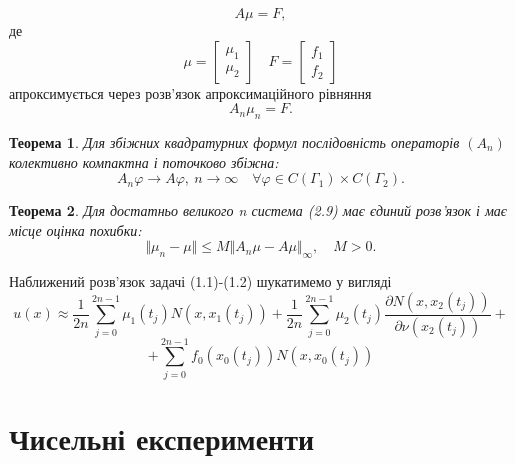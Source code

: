 \documentclass[a4 paper,12pt,ukrainian]{report}
\newtheorem{theorem}{\textbf{Теорема}}[chapter]
\begin{document}
\begin{equation*}
A\mu=F,
\end{equation*}
де 
\begin{equation*}
\mu=\left[
\begin{array}{c}
\mu_{1}\\
\mu_{2}
\end{array}
\right]\quad
F=\left[
\begin{array}{c}
f_{1}\\
f_{2}
\end{array}
\right]
\end{equation*}
апроксимується через розв'язок апроксимаційного рівняння
\begin{equation*}
A_{n}\mu_{n}=F.
\end{equation*}
\begin{theorem}
Для збіжних квадратурних формул послідовність операторів $(A_{n})$ колективно компактна і поточково збіжна:
\begin{equation*}
A_{n}\varphi\rightarrow A\varphi, \ n\to\infty \quad \forall\varphi\in C(\Gamma_{1})\times C(\Gamma_{2}).
\end{equation*}
\end{theorem}
\begin{theorem}
Для достатньо великого n система (2.9) має єдиний розв'язок і має місце оцінка похибки:
\begin{equation*}
\Vert\mu_{n}-\mu\Vert\le M\Vert A_{n}\mu-A\mu\Vert_{\infty}, \quad M>0.
\end{equation*}
\end{theorem}
\hspace*{\parindent}Наближений розв'язок задачі (1.1)-(1.2) шукатимемо у вигляді
\begin{equation*}
u(x)\approx\frac{1}{2n}\sum\limits_{j=0}^{2n-1}{\mu_1(t_j)N(x,x_1(t_j))}+\frac{1}{2n}\sum\limits_{j=0}^{2n-1}{\mu_2(t_j)\frac{\partial N(x,x_2(t_j))}{\partial\nu(x_2(t_j))}}+
\end{equation*}
\begin{equation*}
+\sum\limits_{j=0}^{2n-1}{f_0(x_0(t_j))N(x,x_0(t_j))}
\end{equation*}
\chapter{Чисельні експерименти}
\end{document}
